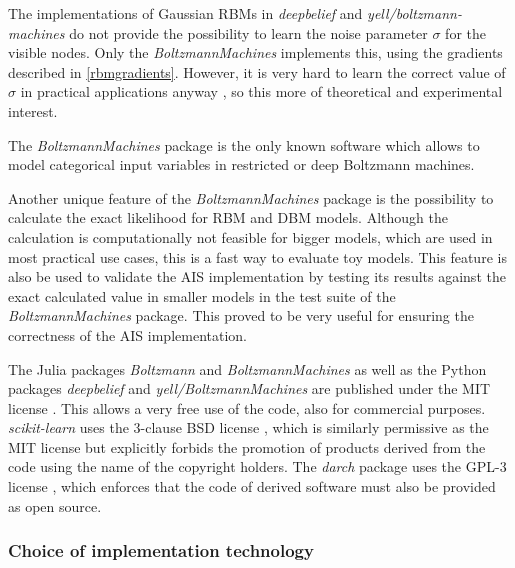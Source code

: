 \documentclass[12pt]{article}
\newcommand{\apkg}[1]{\emph{#1}}
\begin{document}
The implementations of Gaussian RBMs in \apkg{deepbelief} and \apkg{yell/boltzmann-machines} do not provide the possibility to learn the noise parameter $\sigma$ for the visible nodes.
Only the \apkg{BoltzmannMachines} implements this, using the gradients described in \ref{rbmgradients}.
However, it is very hard to learn the correct value of $\sigma$ in practical applications anyway \citep{hinton_practical_2012}, so this more of theoretical and experimental interest.

The \apkg{BoltzmannMachines} package is the only known software which allows to model categorical input variables in restricted or deep Boltzmann machines.

Another unique feature of the \apkg{BoltzmannMachines} package is the possibility to calculate the exact likelihood for RBM and DBM models.
Although the calculation is computationally not feasible for bigger models, which are used in most practical use cases, this is a fast way to evaluate toy models.
This feature is also be used to validate the AIS implementation by testing its results against the exact calculated value in smaller models in the test suite of the \apkg{BoltzmannMachines} package.
This proved to be very useful for ensuring the correctness of the AIS implementation.


The Julia packages \apkg{Boltzmann} and \apkg{BoltzmannMachines} as well as the Python packages \apkg{deepbelief} and \apkg{yell/BoltzmannMachines} are published under the MIT license \citep{mitlicense}.
This allows a very free use of the code, also for commercial purposes.
\apkg{scikit-learn} uses the 3-clause BSD license \citep{bsd3}, which is similarly permissive as the MIT license but explicitly forbids the promotion of products derived from the code using the name of the copyright holders.
The \apkg{darch} package uses the GPL-3 license \citep{gplv3}, which enforces that the code of derived software must also be provided as open source.



\subsubsection{Choice of implementation technology}\label{impltechnology}
\end{document}
